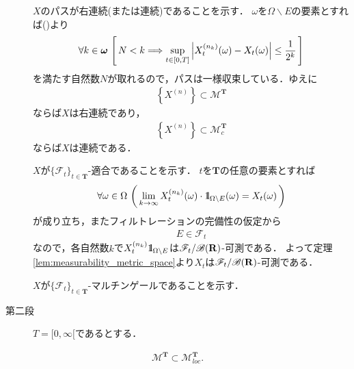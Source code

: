 \begin{sketch}
\begin{description}
				$X$のパスが右連続(または連続)であることを示す．
				$\omega$を$\Omega \backslash E$の要素とすれば()より
				\begin{align}
					\forall k \in {\boldsymbol \omega}\,
					\left[\, N < k \Longrightarrow \operatorname*{sup}_{t \in [0,T]} \left|X_t^{(n_k)}(\omega) - X_t(\omega)\right| \leq \frac{1}{2^k}\, \right]
				\end{align}
				を満たす自然数$N$が取れるので，パスは一様収束している．ゆえに
				\begin{align}
					\left\{X^{(n)}\right\} \subset \mathscr{M}^{\mathbf{T}}
				\end{align}
				ならば$X$は右連続であり，
				\begin{align}
					\left\{X^{(n)}\right\} \subset \mathscr{M}_c^{\mathbf{T}}
				\end{align}
				ならば$X$は連続である．
				
				$X$が$\{\mathscr{F}_t\}_{t \in \mathbf{T}}$-適合であることを示す．
				$t$を$\mathbf{T}$の任意の要素とすれば
				\begin{align}
					\forall \omega \in \Omega\, \left(\, 
					\lim_{k \to \infty} X_t^{(n_k)}(\omega) \cdot \mbox{1}\hspace{-0.25em}\mbox{l}_{\Omega \backslash E}(\omega) = X_t(\omega)\, \right)
				\end{align}
				が成り立ち，またフィルトレーションの完備性の仮定から
				\begin{align}
					E \in \mathscr{F}_t
				\end{align}
				なので，各自然数$k$で$X_t^{(n_k)} \mbox{1}\hspace{-0.25em}\mbox{l}_{\Omega \backslash E}$は$\mathscr{F}_t/\mathscr{B}(\mathbf{R})$-可測である．
				よって定理\ref{lem:measurability_metric_space}より$X_t$は$\mathscr{F}_t/\mathscr{B}(\mathbf{R})$-可測である．
				
				$X$が$\{\mathscr{F}_t\}_{t \in \mathbf{T}}$-マルチンゲールであることを示す．
				
			\item[第二段] $T = [0,\infty[$であるとする．
				
		\end{description}
	\end{sketch}
	
	\begin{screen}
		\begin{dfn}[局所マルチンゲール]
		\end{dfn}
	\end{screen}
	
	\begin{screen}
		\begin{thm}
			\begin{align}
				\mathscr{M}^{\mathbf{T}} \subset \mathscr{M}^{\mathbf{T}}_{loc}.
			\end{align}
		\end{thm}
	\end{screen}
	
	\begin{screen}
		\begin{thm}[マルチンゲールの二乗過程は増大過程とマルチンゲールに分解できる]
		\end{thm}
	\end{screen}
